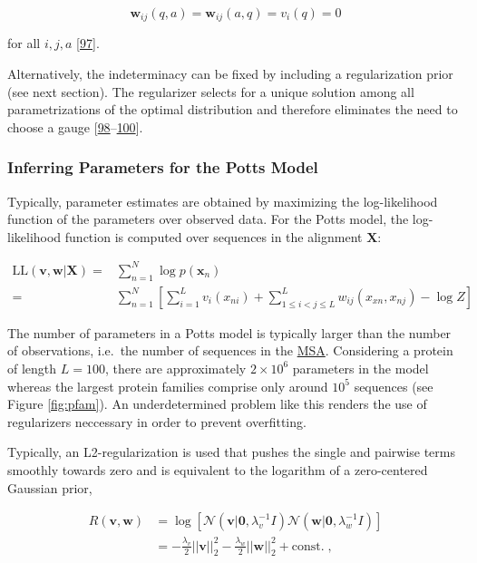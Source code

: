 \documentclass[11pt,a4paper,twoside]{book}
\newcommand{\seq}{\mathbf{x}}
\renewcommand{\v}{\mathbf{v}}
\newcommand{\vi}{v_{i}}
\newcommand{\w}{\mathbf{w}}
\newcommand{\wij}{\mathbf{w}_{ij}}
\theoremstyle{definition}
\theoremstyle{definition}
\theoremstyle{remark}
\begin{document}
\begin{equation}
    \wij(q,a) = \wij(a,q) = \vi(q) = 0
\label{eq:ising-gauge}
\end{equation}

for all \(i,j,a\) {[}\protect\hyperlink{ref-Cocco2017}{97}{]}.

Alternatively, the indeterminacy can be fixed by including a
regularization prior (see next section). The regularizer selects for a
unique solution among all parametrizations of the optimal distribution
and therefore eliminates the need to choose a gauge
{[}\protect\hyperlink{ref-Koller2009}{98}--\protect\hyperlink{ref-Stein2015a}{100}{]}.

\subsubsection{Inferring Parameters for the Potts
Model}\label{potts-mle}

Typically, parameter estimates are obtained by maximizing the
log-likelihood function of the parameters over observed data. For the
Potts model, the log-likelihood function is computed over sequences in
the alignment \(\mathbf{X}\):

\begin{align}
    \text{LL}(\v, \w | \mathbf{X}) =& \sum_{n=1}^N \log p(\seq_n)  \nonumber\\
    =& \sum_{n=1}^N \left[ \sum_{i=1}^L v_i(x_{ni}) + \sum_{1 \leq i < j \leq L}^L w_{ij}(x_{xn}, x_{nj}) - \log Z \right]
\label{eq:full-log-likelihood}
\end{align}

The number of parameters in a Potts model is typically larger than the
number of observations, i.e.~the number of sequences in the
\protect\hyperlink{abbrev}{MSA}. Considering a protein of length
\(L=100\), there are approximately \(2 \times 10^6\) parameters in the
model whereas the largest protein families comprise only around \(10^5\)
sequences (see Figure \ref{fig:pfam}). An underdetermined problem like
this renders the use of regularizers neccessary in order to prevent
overfitting.

Typically, an L2-regularization is used that pushes the single and
pairwise terms smoothly towards zero and is equivalent to the logarithm
of a zero-centered Gaussian prior,

\begin{align}
  R(\v, \w)  &= \log \left[ \mathcal{N}(\v | \mathbf{0}, \lambda_v^{-1} I) \mathcal{N}(\w | \mathbf{0}, \lambda_w^{-1} I) \right] \nonumber \\
             &= -\frac{\lambda_v}{2} ||\v||_2^2 - \frac{\lambda_w}{2} ||\w||_2^2 + \text{const.} \; ,
\label{eq:l2-reg}
\end{align}
\end{document}
